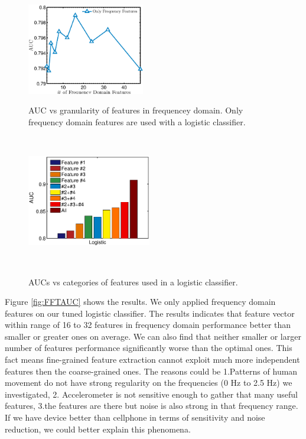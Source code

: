 \documentclass{article} %
\begin{document}
\begin{figure}
    \hspace{-0.5cm}
    \begin{minipage}[t]{0.02\textwidth}~
    \end{minipage}
    \begin{minipage}[t]{0.47\textwidth}
    \centering
    \includegraphics[height=40mm]{fig/fftauc.eps}
    \caption{AUC vs granularity of features in frequencey domain. Only frequency domain features are used with a logistic classifier. }
    \label{fig:FFTAUC}
    \end{minipage}
    \begin{minipage}[t]{0.02\textwidth}~
    \end{minipage}
    \begin{minipage}[t]{0.47\textwidth}
    \centering
    \includegraphics[height=40mm]{fig/feature.eps}\\
    \caption{AUCs vs categories of features used in a logistic classifier. }
    \label{fig:feature}
    \end{minipage}
    \begin{minipage}[t]{0.02\textwidth}~
    \end{minipage}%
 \end{figure}

Figure \ref{fig:FFTAUC} shows the results. We only applied frequency domain features on our tuned logistic classifier. The results indicates that feature vector within range of 16 to 32 features in frequency domain performance better than smaller or greater ones on average. We can also find that neither smaller or larger number of features performance significantly worse than the optimal ones. This fact means fine-grained feature extraction cannot exploit much more independent features then the coarse-grained ones. The reasons could be 1.Patterns of human movement do not have strong regularity on the frequencies (0 Hz to 2.5 Hz) we investigated, 2. Accelerometer is not sensitive enough to gather that many useful features, 3.the features are there but noise is also strong in that frequency range. If we have device better than cellphone in terms of sensitivity and noise reduction, we could better explain this phenomena.
\end{document}
